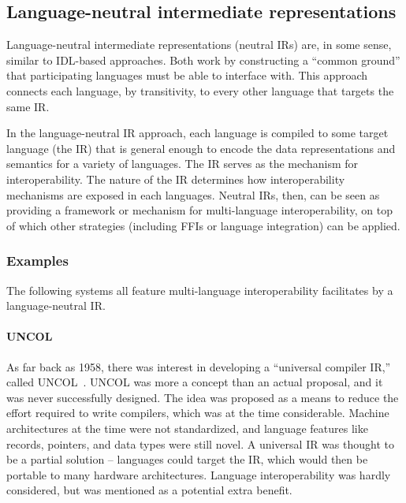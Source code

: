
\subsection{Language-neutral intermediate representations}
\label{neutral_ir}

Language-neutral intermediate representations (neutral IRs) are, in some sense, similar to IDL-based approaches. Both work by constructing a ``common ground'' that participating languages must be able to interface with. This approach connects each language, by transitivity, to every other language that targets the same IR.

In the language-neutral IR approach, each language is compiled to some target language (the IR) that is general enough to encode the data representations and semantics for a variety of languages. The IR serves as the mechanism for interoperability. The nature of the IR determines how interoperability mechanisms are exposed in each languages. Neutral IRs, then, can be seen as providing a framework or mechanism for multi-language interoperability, on top of which other strategies (including FFIs or language integration) can be applied.


\subsubsection{Examples}

The following systems all feature multi-language interoperability facilitates by a language-neutral IR.

\paragraph{UNCOL}

As far back as 1958, there was interest in developing a ``universal compiler IR,'' called UNCOL~\cite{macrakis93andf}. UNCOL was more a concept than an actual proposal, and it was never successfully designed. The idea was proposed as a means to reduce the effort required to write compilers, which was at the time considerable. Machine architectures at the time were not standardized, and language features like records, pointers, and data types were still novel. A universal IR was thought to be a partial solution -- languages could target the IR, which would then be portable to many hardware architectures. Language interoperability was hardly considered, but was mentioned as a potential extra benefit.

